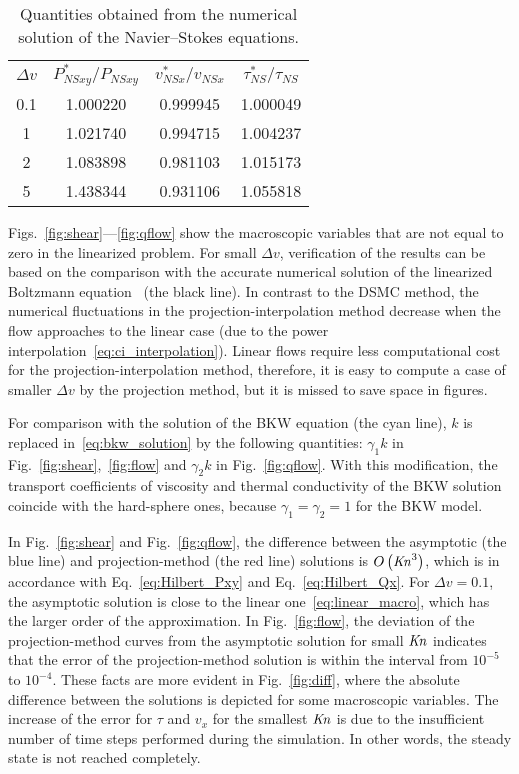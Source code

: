 \documentclass[final]{jfm} %
\newcommand{\Kn}{\mbox{\textit{Kn}}}
\newcommand{\NS}{N\!S}
\newcommand{\OO}[1]{O\left(#1\right)}
\begin{document}
\begin{table}
    \centering
    \begin{tabular}{cccc}
        \(\Delta{v}\) & \(\displaystyle P_{\NS xy}^*/P_{\NS xy}\) & \(\displaystyle v_{\NS x}^*/v_{\NS x}\) & \(\displaystyle \tau_{\NS}^*/\tau_{\NS}\) \\[3pt]
        0.1 & 1.000220 & 0.999945 & 1.000049 \\
          1 & 1.021740 & 0.994715 & 1.004237 \\
          2 & 1.083898 & 0.981103 & 1.015173 \\
          5 & 1.438344 & 0.931106 & 1.055818 \\
    \end{tabular}
    \caption{Quantities obtained from the numerical solution of the Navier--Stokes equations.}
    \label{table:NS_params}
\end{table}

Figs.~\ref{fig:shear}---\ref{fig:qflow} show the macroscopic variables
that are not equal to zero in the linearized problem.
For small \(\Delta{v}\), verification of the results can be based
on the comparison with the accurate numerical solution of
the linearized Boltzmann equation~\citep{Ohwada1990} (the black line).
In contrast to the DSMC method, the numerical fluctuations in the projection-interpolation method
decrease when the flow approaches to the linear case (due to the power interpolation~\eqref{eq:ci_interpolation}).
Linear flows require less computational cost for the projection-interpolation method,
therefore, it is easy to compute a case of smaller \(\Delta{v}\) by the projection method,
but it is missed to save space in figures.

For comparison with the solution of the BKW equation (the cyan line),
\(k\) is replaced in~\eqref{eq:bkw_solution} by the following quantities:
\(\gamma_1k\) in Fig.~\ref{fig:shear},~\ref{fig:flow} and \(\gamma_2k\) in Fig.~\ref{fig:qflow}.
With this modification, the transport coefficients of viscosity and thermal conductivity
of the BKW solution coincide with the hard-sphere ones, because \(\gamma_1=\gamma_2=1\) for the BKW model.

In Fig.~\ref{fig:shear} and Fig.~\ref{fig:qflow}, the difference between the asymptotic (the blue line)
and projection-method (the red line) solutions is \(\OO{\Kn^3}\),
which is in accordance with Eq.~\eqref{eq:Hilbert_Pxy} and Eq.~\eqref{eq:Hilbert_Qx}.
For \(\Delta{v}=0.1\), the asymptotic solution is close to the linear one~\eqref{eq:linear_macro},
which has the larger order of the approximation.
In Fig.~\ref{fig:flow}, the deviation of the projection-method curves
from the asymptotic solution for small \(\Kn\) indicates that
the error of the projection-method solution is within the interval from \(10^{-5}\) to \(10^{-4}\).
These facts are more evident in Fig.~\ref{fig:diff},
where the absolute difference between the solutions
is depicted for some macroscopic variables.
The increase of the error for \(\tau\) and \(v_x\) for the smallest \(\Kn\)
is due to the insufficient number of time steps performed during the simulation.
In other words, the steady state is not reached completely.
\end{document}
